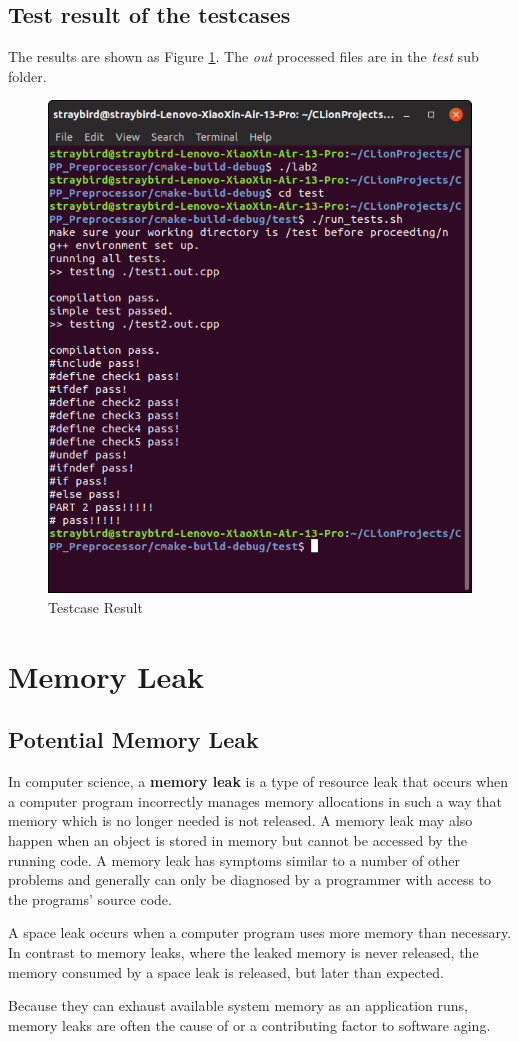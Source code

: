 \documentclass[a4paper]{report}
\begin{document}
\section{Test result of the testcases}
The results are shown as Figure \ref{3}. The \emph{out} processed files are in the \emph{test} sub folder.
\begin{figure}
  \centering
  \includegraphics[width=12cm]{shell.png}
  \caption{Testcase Result}\label{3}
\end{figure}

\chapter{Memory Leak}
\section{Potential Memory Leak}
In computer science, a \textbf{memory leak} is a type of resource leak that occurs when a computer program incorrectly manages memory allocations in such a way that memory which is no longer needed is not released. A memory leak may also happen when an object is stored in memory but cannot be accessed by the running code. A memory leak has symptoms similar to a number of other problems and generally can only be diagnosed by a programmer with access to the programs' source code. 
\par
A space leak occurs when a computer program uses more memory than necessary. In contrast to memory leaks, where the leaked memory is never released, the memory consumed by a space leak is released, but later than expected.
\par
Because they can exhaust available system memory as an application runs, memory leaks are often the cause of or a contributing factor to software aging.
\end{document}
